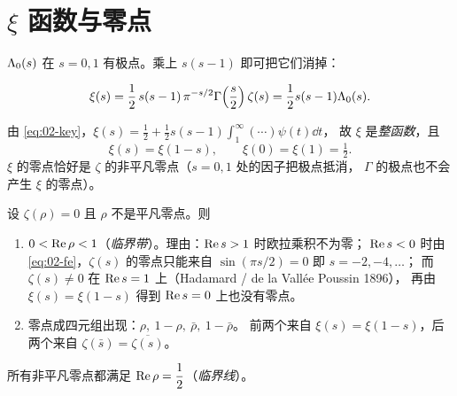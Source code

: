\section{$\xi$ 函数与零点}
\label{sec:02-xi}

$\Lambda_0(s)$ 在 $s=0,1$ 有极点。乘上 $s(s-1)$ 即可把它们消掉：

\begin{definition}[黎曼 $\xi$ 函数，现代记号]
\begin{equation}\label{eq:02-xi}
  \xi(s)=\frac12\,s(s-1)\,\pi^{-s/2}\Gamma\!\left(\frac s2\right)\zeta(s)
  =\frac12 s(s-1)\Lambda_0(s).
\end{equation}
\end{definition}

由 \cref{eq:02-key}，$\xi(s)=\frac12+\frac12 s(s-1)\int_1^\infty(\cdots)\psi(t)\dd t$，
故 $\xi$ 是\emph{整函数}，且
\begin{equation}\label{eq:02-xi-sym}
  \xi(s)=\xi(1-s),\qquad \xi(0)=\xi(1)=\tfrac12 .
\end{equation}
$\xi$ 的零点恰好是 $\zeta$ 的非平凡零点（$s=0,1$ 处的因子把极点抵消，
$\Gamma$ 的极点也不会产生 $\xi$ 的零点）。

\begin{theorem}[零点的位置与对称性]\label{thm:02-zeros}
设 $\zeta(\rho)=0$ 且 $\rho$ 不是平凡零点。则
\begin{enumerate}[label=(\roman*)]
  \item $0<\operatorname{Re}\rho<1$（\emph{临界带}）。理由：$\operatorname{Re} s>1$ 时欧拉乘积不为零；
        $\operatorname{Re} s<0$ 时由 \cref{eq:02-fe}，$\zeta(s)$ 的零点只能来自
        $\sin(\pi s/2)=0$ 即 $s=-2,-4,\dots$；
        而 $\zeta(s)\ne0$ 在 $\operatorname{Re} s=1$ 上（Hadamard / de la Vall\'ee Poussin 1896），
        再由 $\xi(s)=\xi(1-s)$ 得到 $\operatorname{Re} s=0$ 上也没有零点。
  \item 零点成四元组出现：$\rho,\ 1-\rho,\ \bar\rho,\ 1-\bar\rho$。
        前两个来自 $\xi(s)=\xi(1-s)$，后两个来自 $\zeta(\bar s)=\overline{\zeta(s)}$。
\end{enumerate}
\end{theorem}

\begin{definition}
所有非平凡零点都满足 $\operatorname{Re}\rho=\dfrac12$（\emph{临界线}）。
\end{definition}

